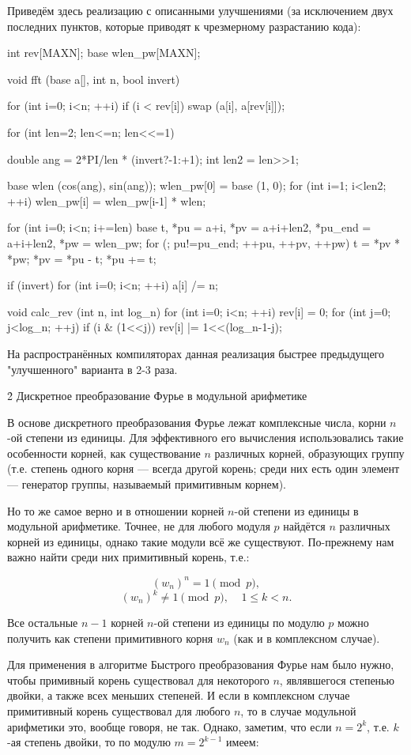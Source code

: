 Приведём здесь реализацию с описанными улучшениями (за исключением двух последних пунктов, которые приводят к чрезмерному разрастанию кода):

\code
int rev[MAXN];
base wlen_pw[MAXN];

void fft (base a[], int n, bool invert) {
	for (int i=0; i<n; ++i)
		if (i < rev[i])
			swap (a[i], a[rev[i]]);
 
	for (int len=2; len<=n; len<<=1) {
		double ang = 2*PI/len * (invert?-1:+1);
		int len2 = len>>1;

		base wlen (cos(ang), sin(ang));
		wlen_pw[0] = base (1, 0);
		for (int i=1; i<len2; ++i)
			wlen_pw[i] = wlen_pw[i-1] * wlen;

		for (int i=0; i<n; i+=len) {
			base t,
				*pu = a+i,
				*pv = a+i+len2, 
				*pu_end = a+i+len2,
				*pw = wlen_pw;
			for (; pu!=pu_end; ++pu, ++pv, ++pw) {
				t = *pv * *pw;
				*pv = *pu - t;
				*pu += t;
			}
		}
	}

	if (invert)
		for (int i=0; i<n; ++i)
			a[i] /= n;
}

void calc_rev (int n, int log_n) {
	for (int i=0; i<n; ++i) {
		rev[i] = 0;
		for (int j=0; j<log_n; ++j)
			if (i & (1<<j))
				rev[i] |= 1<<(log_n-1-j);
	}
}
\endcode

На распространённых компиляторах данная реализация быстрее предыдущего "улучшенного" варианта в 2-3 раза.


\h2{ Дискретное преобразование Фурье в модульной арифметике }

В основе дискретного преобразования Фурье лежат комплексные числа, корни $n$-ой степени из единицы. Для эффективного его вычисления использовались такие особенности корней, как существование $n$ различных корней, образующих группу (т.е. степень одного корня --- всегда другой корень; среди них есть один элемент --- генератор группы, называемый примитивным корнем).

Но то же самое верно и в отношении корней $n$-ой степени из единицы в модульной арифметике. Точнее, не для любого модуля $p$ найдётся $n$ различных корней из единицы, однако такие модули всё же существуют. По-прежнему нам важно найти среди них примитивный корень, т.е.:

$$ (w_n)^n = 1 \pmod p, $$
$$ (w_n)^k \ne 1 {\pmod p}, ~~~~~1 \le k < n. $$

Все остальные $n-1$ корней $n$-ой степени из единицы по модулю $p$ можно получить как степени примитивного корня $w_n$ (как и в комплексном случае).

Для применения в алгоритме Быстрого преобразования Фурье нам было нужно, чтобы примивный корень существовал для некоторого $n$, являвшегося степенью двойки, а также всех меньших степеней. И если в комплексном случае примитивный корень существовал для любого $n$, то в случае модульной арифметики это, вообще говоря, не так. Однако, заметим, что если $n = 2^k$, т.е. $k$-ая степень двойки, то по модулю $m = 2^{k-1}$ имеем:

